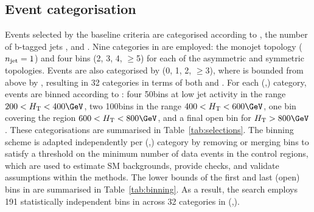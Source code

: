 \subsection{Event categorisation}
\label{sec:categorisation} 

Events selected by the baseline criteria are categorised according to
\njet, the number of b-tagged jets \nb, and \scalht. Nine categories
in \njet are employed: the monojet topology ($n_{\text{jet}} = 1$) and four
\njet bins (2, 3, 4, $\geq$5) for each of the asymmetric and symmetric
topologies. Events are also categorised by \nb (0, 1, 2, $\geq$3),
where \nb is bounded from above by \njet, resulting in 32 categories
in terms of both \njet and \nb. For each (\njet,\nb) category, events
are binned according to \scalht: four 50\GeV bins at low jet activity
in the range $200 < \scalht < 400\GeV$, two 100\GeV bins in the range
$400 < \scalht < 600\GeV$, one bin covering the region $600 < \scalht
< 800\GeV$, and a final open bin for $\scalht > 800\GeV$. These
categorisations are summarised in Table~\ref{tab:selections}. The
\scalht binning scheme is adapted independently per (\njet,\nb)
category by removing or merging bins to satisfy a threshold on the
minimum number of data events in the control regions, which are used
to estimate SM backgrounds, provide checks, and validate assumptions
within the methods. The lower bounds of the first and last (open) bins
in \scalht are summarised in Table~\ref{tab:binning}. As a result, the
search employs 191 statistically independent bins in \scalht across 32
categories in (\njet,\nb).



